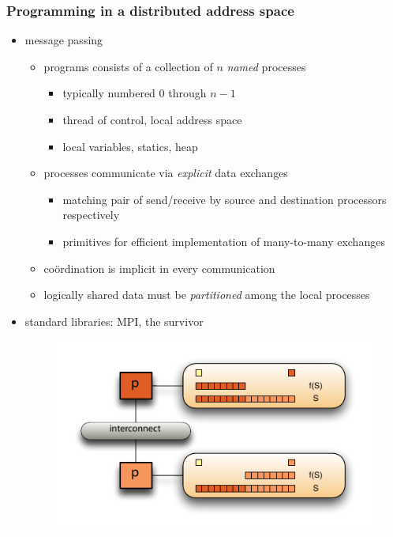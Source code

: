 \begin{frame}[fragile]
%
  \frametitle{Programming in a distributed address space}
%
  \begin{itemize}
%
  \item message passing
    \begin{itemize}
      \item programs consists of a collection of $n$ {\em named} processes
        \begin{itemize}
        \item typically numbered 0 through $n-1$
        \item thread of control, local address space
        \item local variables, statics, heap
        \end{itemize}
      \item processes communicate via {\em explicit} data exchanges
        \begin{itemize}
        \item matching pair of send/receive by source and destination processors respectively
        \item primitives for efficient implementation of many-to-many exchanges
        \end{itemize}
      \item co\"ordination is implicit in every communication
      \item logically shared data must be {\em partitioned} among the local processes
    \end{itemize}
%
  \item standard libraries: MPI, the survivor
%
  \begin{figure}
    \centering
    \includegraphics[width=.5\linewidth]{figures/reduction-distributed.pdf}
    \label{fig:reduction-distributed}
  \end{figure}
%
  \end{itemize}
%
\end{frame}

